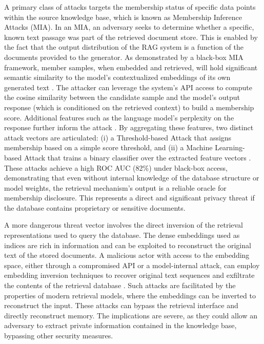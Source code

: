 \documentclass[11pt,a4paper]{article}
\begin{document}
A primary class of attacks targets the membership status of specific data points within the source knowledge base, which is known as Membership Inference Attacks (MIA). In an MIA, an adversary seeks to determine whether a specific, known text passage was part of the retrieved document store. This is enabled by the fact that the output distribution of the RAG system is a function of the documents provided to the generator. As demonstrated by a black-box MIA framework, member samples, when embedded and retrieved, will hold significant semantic similarity to the model's contextualized embeddings of its own generated text \cite{arxiv:2406.19234v1}. The attacker can leverage the system's API access to compute the cosine similarity between the candidate sample and the model's output response (which is conditioned on the retrieved context) to build a membership score. Additional features such as the language model's perplexity on the response further inform the attack \cite{arxiv:2406.19234v1}. By aggregating these features, two distinct attack vectors are articulated: (i) a Threshold-based Attack that assigns membership based on a simple score threshold, and (ii) a Machine Learning-based Attack that trains a binary classifier over the extracted feature vectors \cite{arxiv:2406.19234v1}. These attacks achieve a high ROC AUC (82\%) under black-box access, demonstrating that even without internal knowledge of the database structure or model weights, the retrieval mechanism's output is a reliable oracle for membership disclosure. This represents a direct and significant privacy threat if the database contains proprietary or sensitive documents.

A more dangerous threat vector involves the direct inversion of the retrieval representations used to query the database. The dense embeddings used as indices are rich in information and can be exploited to reconstruct the original text of the stored documents. A malicious actor with access to the embedding space, either through a compromised API or a model-internal attack, can employ embedding inversion techniques to recover original text sequences and exfiltrate the contents of the retrieval database \cite{arxiv:2402.07867v1}. Such attacks are facilitated by the properties of modern retrieval models, where the embeddings can be inverted to reconstruct the input. These attacks can bypass the retrieval interface and directly reconstruct memory. The implications are severe, as they could allow an adversary to extract private information contained in the knowledge base, bypassing other security measures.
\end{document}
